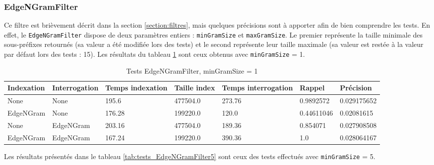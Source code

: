 \subsubsection{EdgeNGramFilter}

Ce filtre est brièvement décrit dans la section \ref{section:filtres}, mais quelques précisions sont à apporter afin de bien comprendre les tests. En effet, le \texttt{EdgeNGramFilter} dispose de deux paramètres entiers : \texttt{minGramSize} et \texttt{maxGramSize}. Le premier représente la taille minimale des sous-préfixes retournés (sa valeur a été modifiée lors des tests) et le second représente leur taille maximale (sa valeur est restée à la valeur par défaut lors des tests : 15). Les résultats du tableau \ref{tab:tests_EdgeNGramFilter1} sont ceux obtenus avec \texttt{minGramSize} = 1.

\begin{table}[!htbp]
    \hspace{-2cm}
                \begin{tabular}{|p{2.5cm}|p{2.5cm}|p{2cm}|p{2cm}|p{2.5cm}|p{2cm}|p{2cm}|}
                    \hline
                    \textbf{Indexation} & \textbf{Interrogation} & \textbf{Temps \mbox{indexation}} & \textbf{Taille \mbox{index}} & \textbf{Temps \mbox{interrogation}} & \textbf{Rappel} & \textbf{Précision}\\
                    \hline
                    None & None & 195.6 & 477504.0 & 273.76 & 0.9892572 & 0.029175652\\
                    \hline
EdgeNGram & None & 176.28 & 199220.0 & 120.0 & 0.44611046 & 0.02081615\\
		\hline
None & EdgeNGram & 203.16 & 477504.0 & 189.36 & 0.854071 & 0.027908508\\
		\hline
EdgeNGram & EdgeNGram & 167.24 & 199220.0 & 390.36 & 1.0 & 0.028064167\\
                    \hline
                \end{tabular}
                \caption{Tests EdgeNGramFilter, minGramSize = 1}
                \label{tab:tests_EdgeNGramFilter1}
            \end{table}

Les résultats présentés dans le tableau \ref{tab:tests_EdgeNGramFilter5} sont ceux des tests effectués avec \texttt{minGramSize} = 5.

